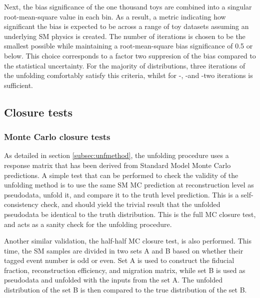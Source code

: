 Next, the bias significance of the one thousand toys are combined into a singular root-mean-square value in each bin. As a result, a metric indicating how significant the bias is expected to be across a range of toy datasets assuming an underlying SM physics is created. The number of iterations is chosen to be the smallest possible while maintaining a root-mean-square bias significance of 0.5 or below. This choice corresponds to a factor two suppresion of the bias compared to the statistical uncertainty. For the majority of distributions, three iterations of the unfolding comfortably satisfy this criteria, whilst for \mZOne-\mFourL, \dPhill-\mFourL and \dYPairs-\mFourL two iterations is sufficient. 
\subsection{Closure tests}
\label{ssec:closuretests}
\subsubsection{Monte Carlo closure tests}

As detailed in section \ref{subsec:unfmethod}, the unfolding procedure uses a response matrix that has been derived from Standard Model Monte Carlo predictions. A simple test that can be performed to check the validity of the unfolding method is to use the same SM MC prediction at reconstruction level as pseudodata, unfold it, and compare it to the truth level prediction. This is a self-consistency check, and should yield the trivial result that the unfolded pseudodata be identical to the truth distribution. This is the full MC closure test, and acts as a sanity check for the unfolding procedure.

Another similar validation, the half-half MC closure test, is also performed. This time, the SM samples are divided in two sets A and B based on whether their tagged event number is odd or even. Set A is used to construct the fiducial fraction, reconstruction efficiency, and migration matrix, while set B is used as pseudodata and unfolded with the inputs from the set A. The unfolded distribution of the set B is then compared to the true distribution of the set B.


